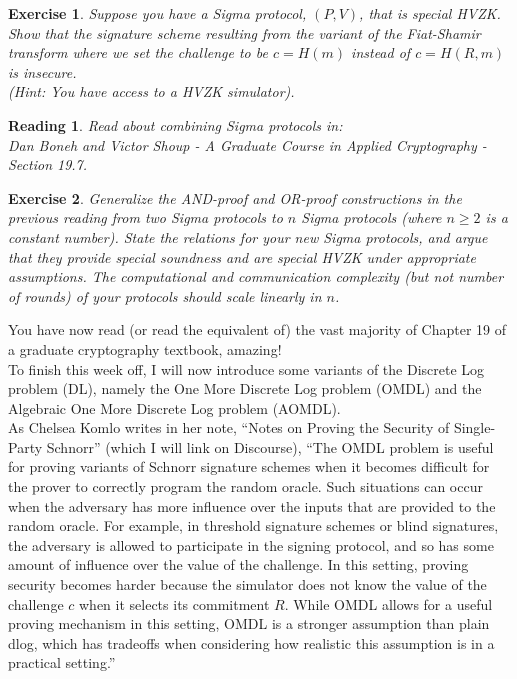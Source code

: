 \documentclass[12pt]{article}
\newtheorem{exercise}{Exercise}
\newtheorem{reading}{Reading}
\theoremstyle{definition}
\theoremstyle{remark}
\theoremstyle{definition}
\begin{document}
\begin{exercise}
Suppose you have a Sigma protocol, $(P, V)$, that is special HVZK. Show that the signature scheme resulting from the variant of the Fiat-Shamir transform where we set the challenge to be $c = H(m)$ instead of $c = H(R, m)$ is insecure.\\
(Hint: You have access to a HVZK simulator).
\end{exercise}

\begin{reading}
Read about combining Sigma protocols in:\\
Dan Boneh and Victor Shoup - A Graduate Course in
Applied Cryptography - Section 19.7.
\end{reading}

\begin{exercise}
Generalize the AND-proof and OR-proof constructions in the previous reading from two Sigma protocols to $n$ Sigma protocols (where $n\geq 2$ is a constant number). State the relations for your new Sigma protocols, and argue that they provide special soundness and are special HVZK under appropriate assumptions. The computational and communication complexity (but not number of rounds) of your protocols should scale linearly in $n$.
\end{exercise}

You have now read (or read the equivalent of) the vast majority of Chapter 19 of a graduate cryptography textbook, amazing!\\

To finish this week off, I will now introduce some variants of the Discrete Log problem (DL), namely the One More Discrete Log problem (OMDL) and the Algebraic One More Discrete Log problem (AOMDL).\\

As Chelsea Komlo writes in her note, ``Notes on Proving the Security of Single-Party Schnorr'' (which I will link on Discourse), ``The OMDL problem is useful for proving variants of Schnorr signature schemes when it becomes difficult for the prover to correctly program the random oracle. Such situations can occur when the adversary has more influence over the inputs that are provided to the random oracle. For example, in threshold signature schemes or blind signatures, the adversary is allowed to participate in the signing protocol, and so has some amount of influence over the value of the challenge. In this setting, proving security becomes harder because the simulator does not know the value of the challenge $c$ when it selects its commitment $R$. While OMDL allows for a useful proving mechanism in this setting, OMDL is a stronger assumption than plain dlog, which has tradeoffs when considering how realistic this assumption is in a practical setting.''\\
\end{document}
